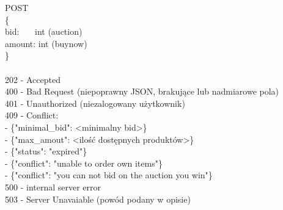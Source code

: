 \documentclass[12pt, notitlepage]{article}
\begin{document}
\begin{appendices}
{POST\\
\{\\
\indent    bid: \ \ \  int (auction)\\
\indent    amount:	int (buynow)\\
\}\\
\\
202 - Accepted\\
400 - Bad Request (niepoprawny JSON, brakujące lub nadmiarowe pola)\\
401 - Unauthorized (niezalogowany użytkownik)\\
409 - Conflict:\\
 - \{"minimal\_bid": <minimalny bid>\}\\
 - \{"max\_amout": <ilość dostępnych produktów>\}\\
 - \{"status": "expired"\}\\
 - \{"conflict": "unable to order own items"\}\\
 - \{"conflict": "you can not bid on the auction you win"\}\\
500 - internal server error\\
503 - Server Unavaiable (powód podany w opisie)\\
}

\end{appendices}
\end{document}
